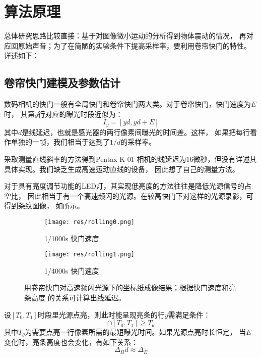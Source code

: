 
\section{算法原理}

总体研究思路比较直接：基于对图像微小运动的分析得到物体震动的情况，
再对应回原始声音；为了在简陋的实验条件下提高采样率，要利用卷帘快门的特性。
详述如下：

\subsection{卷帘快门建模及参数估计\label{sec:rolling-shutter}}
数码相机的快门一般有全局快门和卷帘快门两大类。对于卷帘快门，快门速度为$E$时，
其第$y$行对应的曝光时段近似为：
\begin{equation}
    I_y = [yd, yd+E]
\end{equation}
其中$d$是线延迟，也就是感光器的两行像素间曝光的时间差。这样，
如果把每行看作单独的一帧，我们相当于达到了$1/d$的采样率。

\cite{Davis2014VisualMic}采取测量直线斜率的方法得到Pentax K-01
相机的线延迟为16微秒，但没有详述其具体实现。我们缺乏生成高速运动直线的设备，
因此想了自己的测量方法。

对于具有亮度调节功能的LED灯，其实现低亮度的方法往往是降低光源信号的占空比，
因此相当于有一个高速频闪的光源。在较高快门下对这样的光源录影，可得到条纹图像，
如所示。
\begin{figure}[h!]\begin{center}
    \begin{subfigure}[b]{.5\figwidth}
        \centering
        \texttt{[image: res/rolling0.png]}
        \caption{1/1000s 快门速度}
    \end{subfigure}
    \begin{subfigure}[b]{.5\figwidth}
        \centering
        \texttt{[image: res/rolling1.png]}
        \caption{1/4000s 快门速度}
    \end{subfigure}
    \caption{用卷帘快门对高速频闪光源下的坐标纸成像结果；根据快门速度和亮条高度
        的关系可计算出线延迟。\label{fig:rolling-shutter-record}}
\end{center}\end{figure}

设$[T_0, T_1]$时段里光源点亮，则此时能呈现亮条的行$y$需满足条件：
\begin{equation}
    [yd, yd+E] \cap [T_0, T_1] \ge T_\theta
\end{equation}
其中$T_\theta$为需要点亮一行像素所需的最短曝光时间。如果光源点亮时长恒定，
当$E$变化时，亮条高度也会变化，有如下关系：
\begin{equation}
    \Delta_H d \approx \Delta_E
\end{equation}

